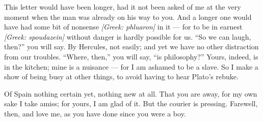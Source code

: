 

 This letter would have been longer, had it not been asked of me at the very moment when the man was already on his way to you. And a longer one would have had some bit of nonsense \textit{[Greek: phluaron]} in it --- for to be in earnest \textit{[Greek: spoudazein]} without danger is hardly possible for us. ``So we can laugh, then?'' you will say. By Hercules, not easily; and yet we have no other distraction from our troubles. ``Where, then,'' you will say, ``is philosophy?'' Yours, indeed, is in the kitchen; mine is a nuisance --- for I am ashamed to be a slave. So I make a show of being busy at other things, to avoid having to hear Plato's rebuke.

 Of Spain nothing certain yet, nothing new at all. That you are away, for my own sake I take amiss; for yours, I am glad of it. But the courier is pressing. Farewell, then, and love me, as you have done since you were a boy.
